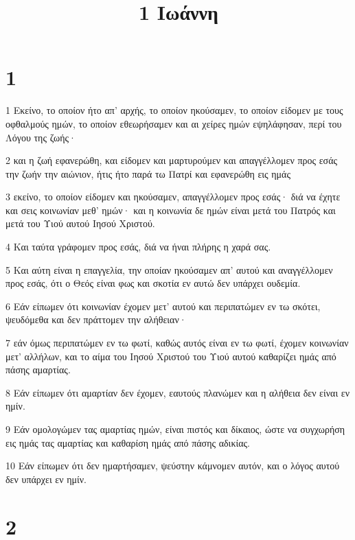 

\title{1 Ιωάννη}


\chapter{1}

\par 1 Εκείνο, το οποίον ήτο απ' αρχής, το οποίον ηκούσαμεν, το οποίον είδομεν με τους οφθαλμούς ημών, το οποίον εθεωρήσαμεν και αι χείρες ημών εψηλάφησαν, περί του Λόγου της ζωής·
\par 2 και η ζωή εφανερώθη, και είδομεν και μαρτυρούμεν και απαγγέλλομεν προς εσάς την ζωήν την αιώνιον, ήτις ήτο παρά τω Πατρί και εφανερώθη εις ημάς
\par 3 εκείνο, το οποίον είδομεν και ηκούσαμεν, απαγγέλλομεν προς εσάς· διά να έχητε και σεις κοινωνίαν μεθ' ημών· και η κοινωνία δε ημών είναι μετά του Πατρός και μετά του Υιού αυτού Ιησού Χριστού.
\par 4 Και ταύτα γράφομεν προς εσάς, διά να ήναι πλήρης η χαρά σας.
\par 5 Και αύτη είναι η επαγγελία, την οποίαν ηκούσαμεν απ' αυτού και αναγγέλλομεν προς εσάς, ότι ο Θεός είναι φως και σκοτία εν αυτώ δεν υπάρχει ουδεμία.
\par 6 Εάν είπωμεν ότι κοινωνίαν έχομεν μετ' αυτού και περιπατώμεν εν τω σκότει, ψευδόμεθα και δεν πράττομεν την αλήθειαν·
\par 7 εάν όμως περιπατώμεν εν τω φωτί, καθώς αυτός είναι εν τω φωτί, έχομεν κοινωνίαν μετ' αλλήλων, και το αίμα του Ιησού Χριστού του Υιού αυτού καθαρίζει ημάς από πάσης αμαρτίας.
\par 8 Εάν είπωμεν ότι αμαρτίαν δεν έχομεν, εαυτούς πλανώμεν και η αλήθεια δεν είναι εν ημίν.
\par 9 Εάν ομολογώμεν τας αμαρτίας ημών, είναι πιστός και δίκαιος, ώστε να συγχωρήση εις ημάς τας αμαρτίας και καθαρίση ημάς από πάσης αδικίας.
\par 10 Εάν είπωμεν ότι δεν ημαρτήσαμεν, ψεύστην κάμνομεν αυτόν, και ο λόγος αυτού δεν υπάρχει εν ημίν.

\chapter{2}


